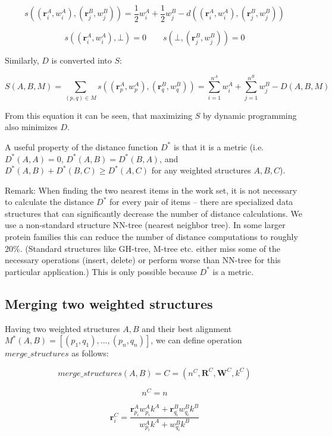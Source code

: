 \documentclass{article}
\begin{document}
\[
  s \left( (\mathbf{r}^A_i, w^A_i), (\mathbf{r}^B_j, w^B_j) \right) 
  = \frac{1}{2} w^A_i + \frac{1}{2} w^B_j - d \left( (\mathbf{r}^A_i, w^A_i), (\mathbf{r}^B_j, w^B_j) \right)
\]

\[
  s \left( (\mathbf{r}^A_i, w^A_i), \bot \right) = 0 \qquad 
  s \left( \bot, (\mathbf{r}^B_j, w^B_j) \right) = 0
\]

Similarly, \(D\) is converted into \(S\):

\[
  S(A, B, M) 
  = \sum\limits_{(p, q) \in M}{s \left( (\mathbf{r}^A_{p}, w^A_{p}), (\mathbf{r}^B_{q}, w^B_{q}) \right)}
  = \sum\limits_{i=1}^{n^A}{w^A_i} + \sum\limits_{j=1}^{n^B}{w^B_j} - D(A, B, M)
\]

From this equation it can be seen, that maximizing \(S\) by dynamic
programming also minimizes \(D\).

A useful property of the distance function \(D^*\) is that it is a
metric (i.e.~\(D^*(A,A) = 0\), \(D^*(A,B) = D^*(B,A)\), and
\(D^*(A,B) + D^*(B,C) \geq D^*(A,C)\) for any weighted structures
\(A, B, C\)).

Remark: When finding the two nearest items in the work set, it is not
necessary to calculate the distance \(D^*\) for every pair of items --
there are specialized data structures that can significantly decrease
the number of distance calculations. We use a non-standard structure
NN-tree (nearest neighbor tree). In some larger protein families this
can reduce the number of distance computations to roughly 20\%. 
(Standard structures like GH-tree, M-tree etc. either miss some of
the necessary operations (insert, delete) or perform worse than NN-tree
for this particular application.) This is only possible because \(D^*\) 
is a metric.




\subsection{Merging two weighted structures}

Having two weighted structures \(A, B\) and their best alignment
\(M^*(A, B) = [(p_1, q_1), ..., (p_n, q_n)]\), we can define operation
\(merge\_structures\) as follows:

\[  merge\_structures(A, B) = C = (n^C, \mathbf{R}^C, \mathbf{W}^C, k^C)  \]

\[  n^C = n  \]

\[  \mathbf{r}^C_i = \frac {\mathbf{r}^A_{p_i} w^A_{p_i} k^A + \mathbf{r}^B_{q_i} w^B_{q_i} k^B} {w^A_{p_i} k^A + w^B_{q_i} k^B}  \]
\end{document}
